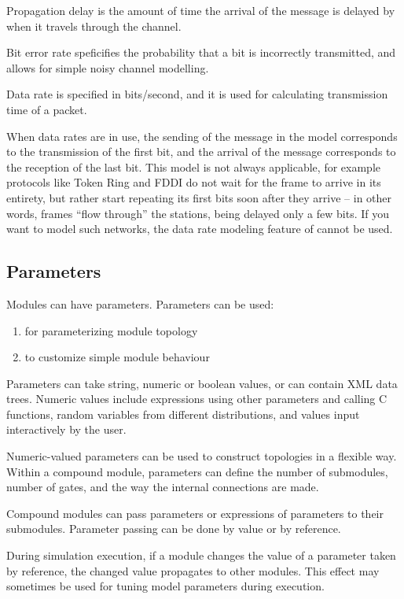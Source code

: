 Propagation delay is the amount of time the arrival of
the message is delayed by when it travels through the channel.

Bit error rate speficifies the probability that a bit is incorrectly
transmitted, and allows for simple noisy channel modelling.

Data rate is specified in bits/second, and it is used for calculating
transmission time of a packet.

When data rates are in use, the sending of the message in the model
corresponds to the transmission of the first bit, and
the arrival of the message corresponds to the reception
of the last bit. This model is not always applicable,
for example protocols like Token Ring and FDDI do not wait
for the frame to arrive in its entirety, but rather start repeating
its first bits soon after they arrive -- in other words,
frames ``flow through'' the stations, being delayed only a few bits.
If you want to model such networks, the data rate modeling feature
of {\opp} cannot be used.



\subsection{Parameters}

Modules can have parameters. Parameters can be used:
\begin{enumerate}
  \item{for parameterizing module topology}
  \item{to customize simple module behaviour}
\end{enumerate}

Parameters can take string, numeric or boolean values, or can
contain XML data trees. Numeric values include expressions using
other parameters and calling C functions, random variables from
different distributions, and values input interactively by the user.


Numeric-valued parameters can be used to construct topologies in a
flexible way. Within a compound module, parameters can define the
number of submodules, number of gates, and the way the internal
connections are made.


Compound modules can pass parameters or expressions of parameters
to their submodules. Parameter passing can be done by value or
by reference.

During simulation execution, if a module changes the value of
a parameter taken by reference, the changed value propagates
to other modules. This effect may sometimes be used for
tuning model parameters during execution.



